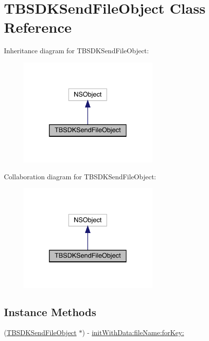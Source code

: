 \hypertarget{interface_t_b_s_d_k_send_file_object}{}\section{T\+B\+S\+D\+K\+Send\+File\+Object Class Reference}
\label{interface_t_b_s_d_k_send_file_object}


Inheritance diagram for T\+B\+S\+D\+K\+Send\+File\+Object\+:\nopagebreak
\begin{figure}[H]
\begin{center}
\leavevmode
\includegraphics[width=198pt]{interface_t_b_s_d_k_send_file_object__inherit__graph}
\end{center}
\end{figure}


Collaboration diagram for T\+B\+S\+D\+K\+Send\+File\+Object\+:\nopagebreak
\begin{figure}[H]
\begin{center}
\leavevmode
\includegraphics[width=198pt]{interface_t_b_s_d_k_send_file_object__coll__graph}
\end{center}
\end{figure}
\subsection*{Instance Methods}
\begin{DoxyCompactItemize}
\item 
(\mbox{\hyperlink{interface_t_b_s_d_k_send_file_object}{T\+B\+S\+D\+K\+Send\+File\+Object}} $\ast$) -\/ \mbox{\hyperlink{interface_t_b_s_d_k_send_file_object_a5f357fb7f1c5d157f37c70f1494c46a4}{init\+With\+Data\+:file\+Name\+:for\+Key\+:}}
\end{DoxyCompactItemize}
